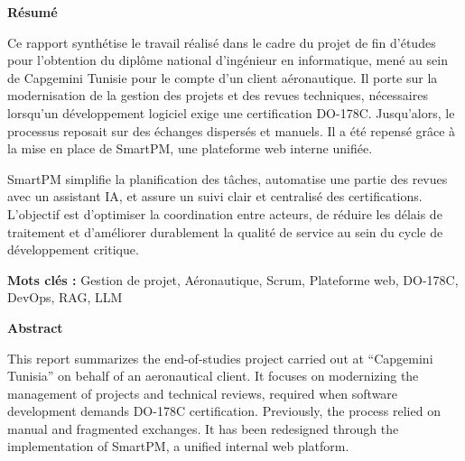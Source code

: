 \newpage
\thispagestyle{empty}
\vspace*{1cm}

\begin{center}
\textbf{\Large R\'esum\'e}
\end{center}
\vspace{0.4cm}

Ce rapport synth\'etise le travail r\'ealis\'e dans le cadre du projet de fin d'\'etudes pour l'obtention du dipl\^ome national d'ing\'enieur en informatique, men\'e au sein de \og Capgemini Tunisie \fg{} pour le compte d'un client a\'eronautique. Il porte sur la modernisation de la gestion des projets et des revues techniques, n\'ecessaires lorsqu'un d\'eveloppement logiciel exige une certification DO-178C. Jusqu'alors, le processus reposait sur des \'echanges dispers\'es et manuels. Il a \'et\'e repens\'e gr\^ace \`a la mise en place de SmartPM, une plateforme web interne unifi\'ee.

SmartPM simplifie la planification des t\^aches, automatise une partie des revues avec un assistant IA, et assure un suivi clair et centralis\'e des certifications. L'objectif est d'optimiser la coordination entre acteurs, de r\'eduire les d\'elais de traitement et d'am\'eliorer durablement la qualit\'e de service au sein du cycle de d\'eveloppement critique.

\vspace{0.4cm}
\noindent\textbf{Mots cl\'es :} Gestion de projet, A\'eronautique, Scrum, Plateforme web, DO-178C, DevOps, RAG, LLM

\newpage
\thispagestyle{empty}
\vspace*{1cm}

\begin{center}
\textbf{\Large Abstract}
\end{center}
\vspace{0.4cm}

This report summarizes the end-of-studies project carried out at ``Capgemini Tunisia'' on behalf of an aeronautical client. It focuses on modernizing the management of projects and technical reviews, required when software development demands DO-178C certification. Previously, the process relied on manual and fragmented exchanges. It has been redesigned through the implementation of SmartPM, a unified internal web platform.


